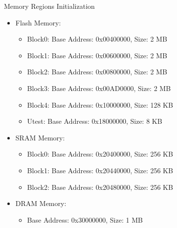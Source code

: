 \begin{frame}{Memory Regions Initialization}
    \begin{itemize}
        \item Flash Memory:
        \begin{itemize}
            \item Block0: Base Address: 0x00400000, Size: 2 MB
            \item Block1: Base Address: 0x00600000, Size: 2 MB
            \item Block2: Base Address: 0x00800000, Size: 2 MB
            \item Block3: Base Address: 0x00AD0000, Size: 2 MB
            \item Block4: Base Address: 0x10000000, Size: 128 KB
            \item Utest: Base Address: 0x18000000, Size: 8 KB
        \end{itemize}
        \item SRAM Memory:
        \begin{itemize}
            \item Block0: Base Address: 0x20400000, Size: 256 KB
            \item Block1: Base Address: 0x20440000, Size: 256 KB
            \item Block2: Base Address: 0x20480000, Size: 256 KB
        \end{itemize}
        \item DRAM Memory:
        \begin{itemize}
            \item Base Address: 0x30000000, Size: 1 MB
        \end{itemize}
    \end{itemize}
\end{frame}

